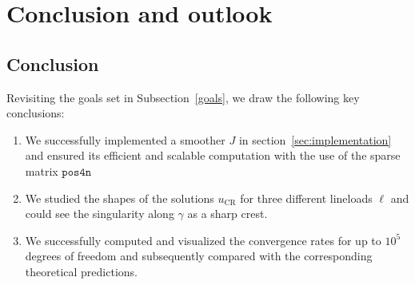 \documentclass[11pt,a4paper]{article}
\newcommand{\uCR}{u_{\mathrm{CR}}}
\begin{document}
\section{Conclusion and outlook}
\subsection{Conclusion}
Revisiting the goals set in Subsection~\ref{goals}, we draw the following key conclusions: 
\begin{enumerate}
    \item We successfully implemented a smoother \(J\) in section~\ref{sec:implementation} and ensured its efficient and scalable computation with the use of the sparse matrix \(\texttt{pos4n}\)
    \item We studied the shapes of the solutions \(\uCR\) for three different lineloads \(\ell\) and could see the singularity along \(\gamma\) as a sharp crest. 
    \item We successfully computed and visualized the convergence rates for up to $10^5$ degrees of freedom and subsequently compared with the corresponding theoretical predictions.
\end{enumerate}
\end{document}
